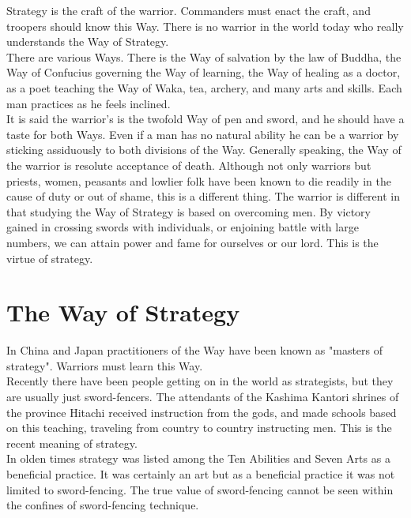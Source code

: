 
Strategy is the craft of the warrior. Commanders must enact the craft, and troopers should know this Way. There is no warrior in the world today who really understands the Way of Strategy.\\

There are various Ways. There is the Way of salvation by the law of Buddha, the Way of Confucius governing the Way of learning, the Way of healing as a doctor, as a poet teaching the Way of Waka, tea, archery, and many arts and skills. Each man practices as he feels inclined.\\

It is said the warrior's is the twofold Way of pen and sword, and he should have a taste for both Ways. Even if a man has no natural ability he can be a warrior by sticking assiduously to both divisions of the Way. Generally speaking, the Way of the warrior is resolute acceptance of death. Although not only warriors but priests, women, peasants and lowlier folk have been known to die readily in the cause of duty or out of shame, this is a different thing. The warrior is different in that studying the Way of Strategy is based on overcoming men. By victory gained in crossing swords with individuals, or enjoining battle with large numbers, we can attain power and fame for ourselves or our lord. This is the virtue of strategy.\\
\section{The Way of Strategy}

In China and Japan practitioners of the Way have been known as "masters of strategy". Warriors must learn this Way.\\

Recently there have been people getting on in the world as strategists, but they are usually just sword-fencers. The attendants of the Kashima Kantori shrines of the province Hitachi received instruction from the gods, and made schools based on this teaching, traveling from country to country instructing men. This is the recent meaning of strategy.\\

In olden times strategy was listed among the Ten Abilities and Seven Arts as a beneficial practice. It was certainly an art but as a beneficial practice it was not limited to sword-fencing. The true value of sword-fencing cannot be seen within the confines of sword-fencing technique.\\

